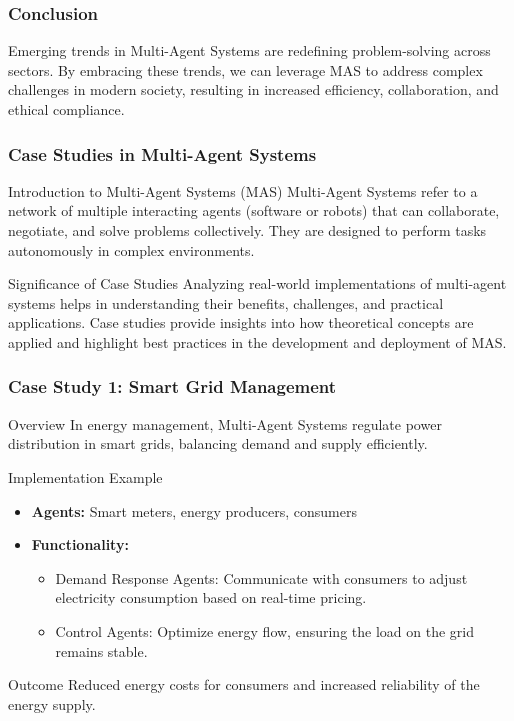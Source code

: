\documentclass[aspectratio=169]{beamer}
\begin{document}
\begin{frame}[fragile]
    \frametitle{Conclusion}
    Emerging trends in Multi-Agent Systems are redefining problem-solving across sectors. By embracing these trends, we can leverage MAS to address complex challenges in modern society, resulting in increased efficiency, collaboration, and ethical compliance.
\end{frame}

\begin{frame}[fragile]
    \frametitle{Case Studies in Multi-Agent Systems}
    
    \begin{block}{Introduction to Multi-Agent Systems (MAS)}
        Multi-Agent Systems refer to a network of multiple interacting agents (software or robots) that can collaborate, negotiate, and solve problems collectively. They are designed to perform tasks autonomously in complex environments.
    \end{block}

    \begin{block}{Significance of Case Studies}
        Analyzing real-world implementations of multi-agent systems helps in understanding their benefits, challenges, and practical applications. Case studies provide insights into how theoretical concepts are applied and highlight best practices in the development and deployment of MAS.
    \end{block}
\end{frame}

\begin{frame}[fragile]
    \frametitle{Case Study 1: Smart Grid Management}
    
    \begin{block}{Overview}
        In energy management, Multi-Agent Systems regulate power distribution in smart grids, balancing demand and supply efficiently.
    \end{block}
    
    \begin{block}{Implementation Example}
        \begin{itemize}
            \item \textbf{Agents:} Smart meters, energy producers, consumers
            \item \textbf{Functionality:}
                \begin{itemize}
                    \item Demand Response Agents: Communicate with consumers to adjust electricity consumption based on real-time pricing.
                    \item Control Agents: Optimize energy flow, ensuring the load on the grid remains stable.
                \end{itemize}
        \end{itemize}
    \end{block}

    \begin{block}{Outcome}
        Reduced energy costs for consumers and increased reliability of the energy supply.
    \end{block}
\end{frame}
\end{document}
